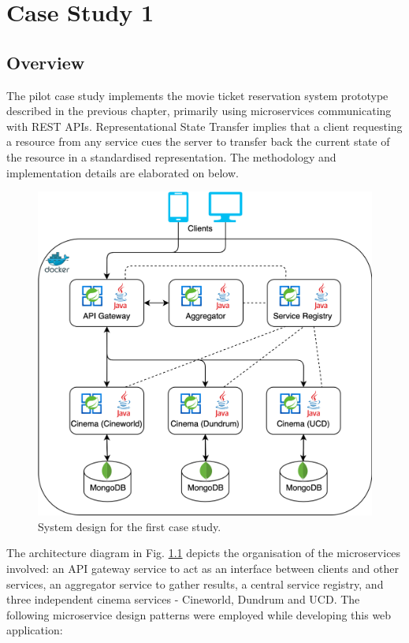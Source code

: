 \chapter{Case Study 1}

\section{Overview}

The pilot case study implements the movie ticket reservation system prototype described in the previous chapter, primarily using microservices communicating with REST APIs. Representational State Transfer implies that a client requesting a resource from any service cues the server to transfer back the current state of the resource in a standardised representation. The methodology and implementation details are elaborated on below.

\begin{figure}[H]
  \centering
  \includegraphics[width=0.75\linewidth]{./assets/diagrams/cs01-arch.png}
  \caption{System design for the first case study.}
  \label{fig:cs01-arch}
\end{figure}

The architecture diagram in Fig. \ref{fig:cs01-arch} depicts the organisation of the microservices involved: an API gateway service to act as an interface between clients and other services, an aggregator service to gather results, a central service registry, and three independent cinema services - Cineworld, Dundrum and UCD. The following microservice design patterns were employed while developing this web application:

